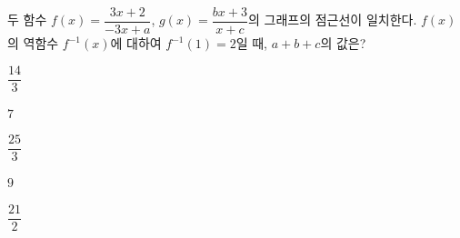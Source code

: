 \hspace*{2mm}\begin{minipage}[t]{\dimexpr\linewidth-2mm\relax}\vspace{0pt}
두 함수 $f(x)=\dfrac{3x+2}{-3x+a}$, $g(x)=\dfrac{bx+3}{x+c}$의 그래프의 점근선이 일치한다. $f(x)$의 역함수 $f^{-1}(x)$에 대하여 $f^{-1}(1)=2$일 때, $a+b+c$의 값은? 
\begin{choices32}{\rule[-3ex]{0pt}{8ex}$\dfrac{14}{3}$}{\rule[-3ex]{0pt}{8ex}$7$}{\rule[-3ex]{0pt}{8ex}$\dfrac{25}{3}$}{\rule[-3ex]{0pt}{8ex}$9$}{\rule[-3ex]{0pt}{8ex}$\dfrac{21}{2}$}\end{choices32}\end{minipage}
